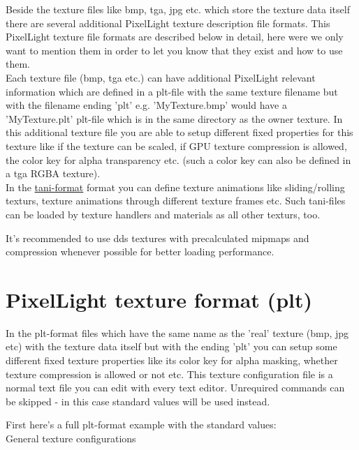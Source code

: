 Beside the texture files like bmp, tga, jpg etc. which store the texture data itself there are
several additional PixelLight texture description file formats. This PixelLight texture file formats are described below in
detail, here were we only want to mention them in order to let you know that they exist and how to
use them.\\
Each texture file (bmp, tga etc.) can have additional PixelLight relevant information which are defined
in a plt-file with the same texture filename but with the filename ending 'plt' e.g. 'MyTexture.bmp'
would have a 'MyTexture.plt' plt-file which is in the same directory as the owner texture. In this
additional texture file you are able to setup different fixed properties for this texture like if
the texture can be scaled, if \ac{GPU} texture compression is allowed, the color key for alpha transparency
etc. (such a color key can also be defined in a tga RGBA texture).\\
In the \hyperlink{tani}{tani-format} format you can define texture animations like sliding/rolling
texturs, texture animations through different texture frames etc. Such tani-files can be loaded by
texture handlers and materials as all other texturs, too.

It's recommended to use dds textures with precalculated mipmaps and compression whenever possible
for better loading performance.




\section{PixelLight texture format (plt)}
In the plt-format files which have the same name as the 'real' texture (bmp, jpg etc) with the texture
data itself but with the ending 'plt' you can setup some different fixed texture properties like its
color key for alpha masking, whether texture compression is allowed or not etc. This texture
configuration file is a normal text file you can edit with every text editor. Unrequired commands
can be skipped - in this case standard values will be used instead.

First here's a full plt-format example with the standard values:\\



General texture configurations\\

